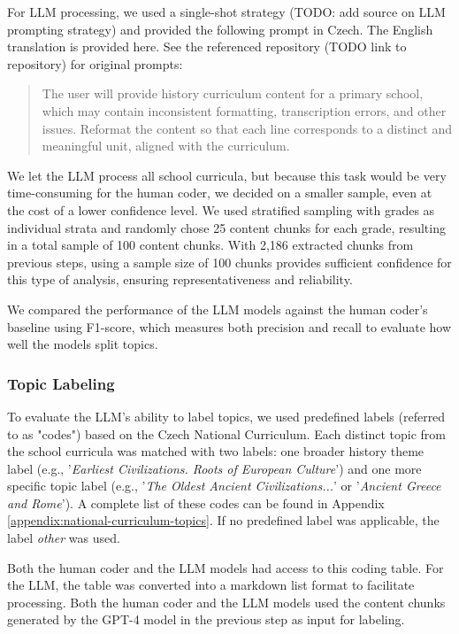 \documentclass[]{interact}
\theoremstyle{plain}%
\theoremstyle{definition}
\theoremstyle{remark}
\begin{document}
For LLM processing, we used a single-shot strategy (TODO: add source on LLM prompting strategy) and provided the following prompt in Czech. The English translation is provided here. See the referenced repository (TODO link to repository) for original prompts:

\begin{quotation}
    The user will provide history curriculum content for a primary school, which may contain inconsistent formatting, transcription errors, and other issues. Reformat the content so that each line corresponds to a distinct and meaningful unit, aligned with the curriculum.
\end{quotation}


We let the LLM process all school curricula, but because this task would be very time-consuming for the human coder, we decided on a smaller sample, even at the cost of a lower confidence level. We used stratified sampling with grades as individual strata and randomly chose 25 content chunks for each grade, resulting in a total sample of 100 content chunks. With 2,186 extracted chunks from previous steps, using a sample size of 100 chunks provides sufficient confidence for this type of analysis, ensuring representativeness and reliability.

We compared the performance of the LLM models against the human coder’s baseline using F1-score, which measures both precision and recall to evaluate how well the models split topics.


\subsubsection{Topic Labeling}

To evaluate the LLM’s ability to label topics, we used predefined labels (referred to as "codes") based on the Czech National Curriculum. Each distinct topic from the school curricula was matched with two labels: one broader history theme label (e.g., '\textit{Earliest Civilizations. Roots of European Culture}') and one more specific topic label (e.g., '\textit{The Oldest Ancient Civilizations...}' or '\textit{Ancient Greece and Rome}'). A complete list of these codes can be found in Appendix \ref{appendix:national-curriculum-topics}. If no predefined label was applicable, the label \textit{other} was used.

Both the human coder and the LLM models had access to this coding table. For the LLM, the table was converted into a markdown list format to facilitate processing. Both the human coder and the LLM models used the content chunks generated by the GPT-4 model in the previous step as input for labeling. 
\end{document}
